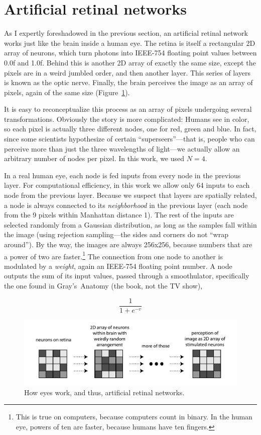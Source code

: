 \documentclass[twocolumn]{article}
\begin{document}
\section{Artificial retinal networks}

As I expertly foreshadowed in the previous section, an artificial
retinal network works just like the brain inside a human eye. The
retina is itself a rectangular 2D array of neurons, which turn photons
into IEEE-754 floating point values between 0.0f and 1.0f. Behind this
is another 2D array of exactly the same size, except the pixels are in
a weird jumbled order, and then another layer. This series of layers
is known as the optic nerve. Finally, the brain perceives the image as
an array of pixels, again of the same size (Figure~\ref{fig:retinal}).

It is easy to reconceptualize this process as an array of pixels
undergoing several transformations. Obviously the story is more
complicated: Humans see in color, so each pixel is actually three
different nodes, one for red, green and blue. In fact, since some
scientists hypothesize of certain ``superseers''---that is, people who
can perceive more than just the three wavelengths of light---we
actually allow an arbitrary number of nodes per pixel. In this work,
we used $N=4$.

In a real human eye, each node is fed inputs from every node in the
previous layer. For computational efficiency, in this work we allow
only 64 inputs to each node from the previous layer. Because we
suspect that layers are spatially related, a node is always connected
to its {\em neighborhood} in the previous layer (each node from the 9
pixels within Manhattan distance 1). The rest of the inputs are
selected randomly from a Gaussian distribution, as long as the samples
fall within the image (using rejection sampling---the sides and
corners do not ``wrap around''). By the way, the images are always
256x256, because numbers that are a power of two are
faster.\!\footnote{This is true on computers, because computers count
in binary. In the human eye, powers of ten are faster, because humans
have ten fingers.} The connection from one node to another is
modulated by a {\em weight}, again an IEEE-754 floating point number.
A node outputs the sum of its input values, passed through a
smoothulator, specifically the one found in Gray's~Anatomy (the book,
not the TV show),

$$ \frac{1}{1 + e^{-v}} $$

\begin{figure}[tb]
\includegraphics[width=0.95 \linewidth]{retinal}
\caption{ How eyes work, and thus, artificial retinal networks. } \label{fig:retinal}
\end{figure}
\end{document}
